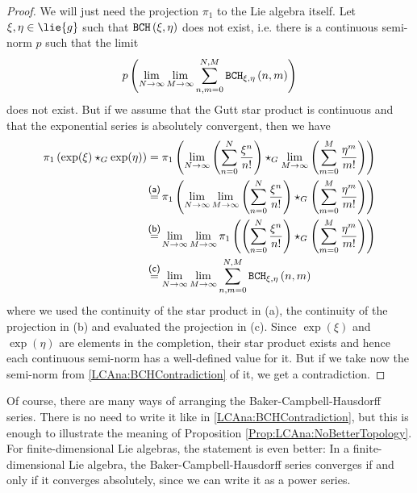 \begin{proof}
	We will just need the projection $\pi_1$ to the Lie algebra itself. Let 
	$\xi, \eta \in \lie{g}$ such that $\mathtt{BCH}\left(\xi, \eta\right)$ does not exist, i.e.
	there is a continuous semi-norm $p$ such that the limit
	\begin{equation}\label{LCAna:BCHContradiction}
		p \left(
			\lim_{N \rightarrow \infty}
			\lim_{M \rightarrow \infty}		
			\sum\limits_{n,m = 0}^{N,M}
			\mathtt{BCH}_{\xi, \eta}\left(n, m\right)
		\right)				
	\end{equation}
	does not exist. But if we assume that the Gutt star product is continuous
	and that the exponential series is absolutely convergent, then we have
	\begin{align*}
	\pi_1 \left( \exp(\xi) \star_G \exp(\eta) \right)
	& =
	\pi_1
	\left(
		\lim_{N \rightarrow \infty}
		\left(
			\sum\limits_{n=0}^N
			\frac{\xi^n}{n!}
		\right)
		\star_G
		\lim_{M \rightarrow \infty}
		\left(
			\sum\limits_{m=0}^M
			\frac{\eta^m}{m!}
		\right)
	\right)
	\\
	& \ot{(a)}{=}
	\pi_1
	\left(
		\lim_{N \rightarrow \infty}
		\lim_{M \rightarrow \infty}
		\left(
			\sum\limits_{n=0}^N
			\frac{\xi^n}{n!}
		\right)
		\star_G
		\left(
			\sum\limits_{m=0}^M
			\frac{\eta^m}{m!}
		\right)
	\right)
	\\
	& \ot{(b)}{=}
	\lim_{N \rightarrow \infty}
	\lim_{M \rightarrow \infty}
	\pi_1
	\left(	
		\left(
			\sum\limits_{n=0}^N
			\frac{\xi^n}{n!}
		\right)
		\star_G
		\left(
			\sum\limits_{m=0}^M
			\frac{\eta^m}{m!}
		\right)
	\right)
	\\
	& \ot{(c)}{=}
	\lim_{N \rightarrow \infty}
	\lim_{M \rightarrow \infty}
	\sum\limits_{n,m=0}^{N, M}
	\bchparts{\xi}{\eta}{n}{m}
	\end{align*}
	where we used the continuity of the star product in (a), the continuity of 
	the projection in (b) and evaluated the projection in (c). Since 
	$\exp(\xi)$ and $\exp(\eta)$ are elements in the completion, their star 
	product exists and hence each continuous semi-norm has a well-defined 
	value for it. But if we take now the semi-norm from 
	\eqref{LCAna:BCHContradiction} of it, we get a contradiction.
\end{proof}
Of course, there are many ways of arranging the Baker-Campbell-Hausdorff 
series. There is no need to write it like in \eqref{LCAna:BCHContradiction}, 
but this is enough to illustrate the meaning of Proposition 
\ref{Prop:LCAna:NoBetterTopology}. For finite-dimensional Lie algebras, the 
statement is even better: In a finite-dimensional Lie algebra, the 
Baker-Campbell-Hausdorff series converges if and only if it converges 
absolutely, since we can write it as a power series.



